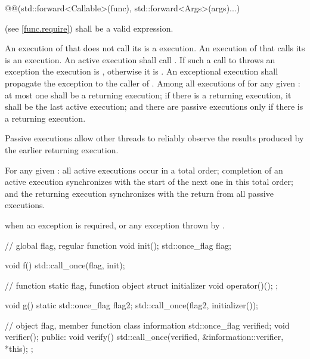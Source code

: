 \begin{itemdescr}
\pnum
\requires
\begin{codeblock}
@@(std::forward<Callable>(func), std::forward<Args>(args)...)
\end{codeblock}
(see \ref{func.require}) shall be a valid expression.

\pnum
\effects An execution of  that does not call its  is a
 execution. An execution of  that calls its 
is an  execution. An active execution shall call
. If such a call to 
throws an exception the execution is , otherwise it is .
An exceptional execution shall propagate the exception to the caller of
. Among all executions of  for any given
: at most one shall be a returning execution; if there is a
returning execution, it shall be the last active execution; and there are
passive executions only if there is a returning execution. \begin{note} Passive
executions allow other threads to reliably observe the results produced by the
earlier returning execution. \end{note}

\pnum
\sync For any given : all active executions occur in a total
order; completion of an active execution synchronizes with
the start of the next one in this total order; and the returning execution
synchronizes with the return from all passive executions.

\pnum\throws {} when
an exception is required, or any exception thrown by .

\pnum
\begin{example}
\begin{codeblock}
// global flag, regular function
void init();
std::once_flag flag;

void f() {
  std::call_once(flag, init);
}

// function static flag, function object
struct initializer {
  void operator()();
};

void g() {
  static std::once_flag flag2;
  std::call_once(flag2, initializer());
}

// object flag, member function
class information {
  std::once_flag verified;
  void verifier();
public:
  void verify() { std::call_once(verified, &information::verifier, *this); }
};
\end{codeblock}
\end{example}
\end{itemdescr}


